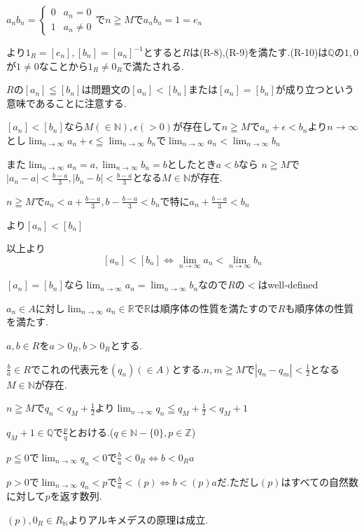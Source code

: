 \documentclass{jsarticle}
\begin{document}
$a_nb_n=\begin{cases}
0 & a_n = 0\\
1 & a_n\neq 0
\end{cases}$で$n\geqq M$で$a_nb_n=1=e_n$

より$1_R=[e_n],[b_n]=[a_n]^{-1}$とすると$R$は(R-8),(R-9)を満たす.(R-10)は$\mathbb{Q}$の$1,0$が$1\neq 0$なことから$1_R\neq 0_R$で満たされる.

$R$の$[a_n]\leqq [b_n]$は問題文の$[a_n]<[b_n]$または$[a_n]=[b_n]$が成り立つという意味であることに注意する.

$[a_n]<[b_n]$なら$M(\in\mathbb{N}),\epsilon (>0)$が存在して$n\geqq M$で$a_n+\epsilon < b_n$より$n\to\infty$とし$\displaystyle \lim_{n\to\infty} a_n +\epsilon \leqq \lim_{n\to\infty}b_n$で$\displaystyle \lim_{n\to\infty} a_n < \lim_{n\to\infty}b_n$

また$\displaystyle \lim_{n\to\infty} a_n=a, \lim_{n\to\infty}b_n=b$としたとき$a<b$なら
$n\geqq M$で$|a_n-a|<\frac{b-a}{3},|b_n-b|<\frac{b-a}{3}$となる$M\in\mathbb{N}$が存在.

$n\geqq M$で$a_n<a+\frac{b-a}{3},b-\frac{b-a}{3}<b_n$で特に$a_n+\frac{b-a}{3}<b_n$

より$[a_n]<[b_n]$

以上より\[[a_n]<[b_n] \Leftrightarrow \lim_{n\to\infty}a_n<\lim_{n\to\infty}b_n\]

$[a_n]=[b_n]$なら$\displaystyle \lim_{n\to\infty}a_n = \lim_{n\to\infty}b_n$なので$R$の$<$はwell-defined

$a_n \in A$に対し$\displaystyle \lim_{n\to\infty}a_n \in \mathbb{R}$で$\mathbb{R}$は順序体の性質を満たすので$R$も順序体の性質を満たす.

$a,b\in R$を$a>0_R,b>0_R$とする.

$\frac{b}{a}\in R$でこれの代表元を$(q_n) (\in A)$とする.$n,m\geqq M$で$|q_n-q_m|<\frac{1}{2}$となる$M\in\mathbb{N}$が存在.

$n\geqq M$で$q_n < q_M+\frac{1}{2}$より$\displaystyle \lim_{n\to\infty} q_n \leqq q_M+\frac{1}{2} < q_M+1$

$q_M+1\in\mathbb{Q}$で$\frac{p}{q}$とおける.($q\in\mathbb{N}-\{0\},p\in\mathbb{Z}$)

$p\leqq 0$で$\displaystyle \lim_{n\to\infty} q_n < 0$で$\frac{b}{a} < 0_R\Leftrightarrow b < 0_Ra$

$p>0$で$\displaystyle \lim_{n\to\infty} q_n < p$で$\frac{b}{a} < (p)\Leftrightarrow b < (p)a$だ.ただし$(p)$はすべての自然数に対して$p$を返す数列.

$(p),0_R\in R_{\mathbb{N}}$よりアルキメデスの原理は成立.
\end{document}
